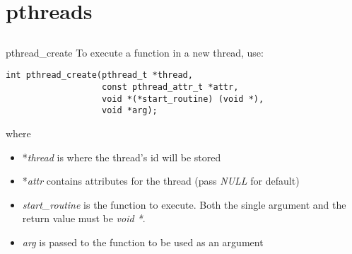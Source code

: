 \section{pthreads}
\subsection{}
\begin{frame}[fragile]{pthread\_create}
    To execute a function in a new thread, use:
    \begin{lstlisting}[numbers=none]
int pthread_create(pthread_t *thread,
                   const pthread_attr_t *attr,
                   void *(*start_routine) (void *),
                   void *arg);
\end{lstlisting}
    where
    \begin{itemize}
	    	\item *\textit{thread} is where the thread's id will be stored
	    	\item *\textit{attr} contains attributes for the thread (pass \textit{NULL} for default)
	    	\item \textit{start\_routine} is the function to execute. Both the single argument and the return value must be \textit{void *}.
	    	\item \textit{arg} is passed to the function to be used as an argument
    \end{itemize}
\end{frame}

